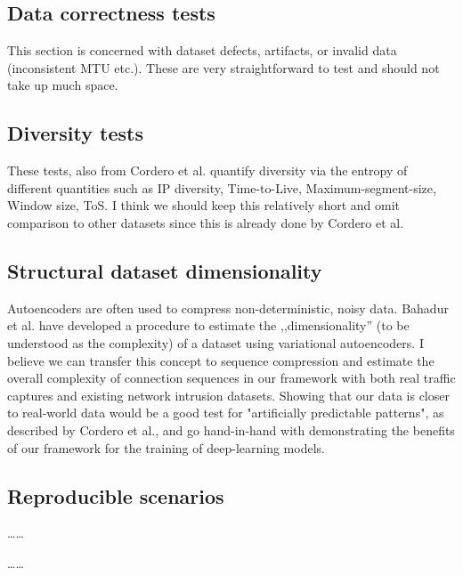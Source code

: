 \documentclass[sigconf]{acmart}
\begin{document}
\subsection{Data correctness tests}

This section is concerned with dataset defects, artifacts, or invalid data (inconsistent MTU etc.). These are very straightforward to test and should not take up much space. 


\subsection{Diversity tests}

These tests, also from Cordero et al. quantify diversity via the entropy of different quantities such as IP diversity, Time-to-Live, Maximum-segment-size, Window size, ToS. I think we should keep this relatively short and omit comparison to other datasets since this is already done by Cordero et al. 


\subsection{Structural dataset dimensionality}

Autoencoders are often used to compress non-deterministic, noisy data. Bahadur et al. have developed a procedure to estimate the ,,dimensionality'' (to be understood as the complexity) of a dataset using variational autoencoders. I believe we can transfer this concept to sequence compression and estimate the overall complexity of connection sequences in our framework with both real traffic captures and existing network intrusion datasets. Showing that our data is closer to real-world data would be a good test for "artificially predictable patterns", as described by Cordero et al., and go hand-in-hand with demonstrating the benefits of our framework for the training of deep-learning models.





\subsection{Reproducible scenarios}\label{Sec:deterministic}

\dots \dots

\dots \dots
\end{document}
